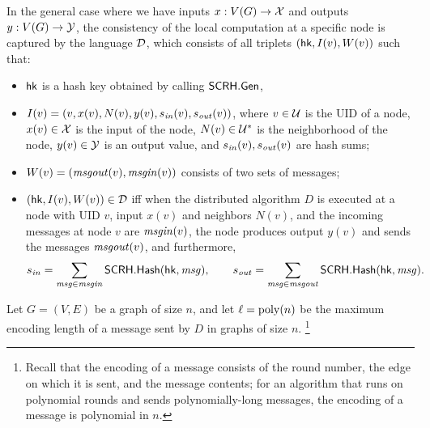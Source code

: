 In the general case where we have inputs $x : V(G) \rightarrow \mathcal{X}$
and outputs $y : V(G) \rightarrow \mathcal{Y}$,
the consistency of the local computation at a specific node is captured
by the
language $\mathcal{D}$,
which consists of all triplets $(\mathsf{hk}, I(v), W(v))$ such that:
\begin{itemize}
	\item $\mathsf{hk}$ is a hash key obtained by calling $\mathsf{SCRH}.\mathsf{Gen}$,
	\item $I(v) = (v, x(v), N(v), y(v), s_{\mathit{ in }}(v), s_{\mathit{ out }}(v))$,
		where
		$v \in \mathcal{U}$ is the UID of a node,
		$x(v) \in \mathcal{X}$ is the input of the node,
		$N(v) \in \mathcal{U}^{\ast}$ is the neighborhood of the node,
		$y(v) \in \mathcal{Y}$ is an output value, and $s_{\mathit{ in }}(v), s_{\mathit{ out }}(v)$ are hash sums;
	\item $W(v) = (\mathit{ msgout }(v), \mathit{ msgin }(v))$ consists of two sets of messages;
	\item $(\mathsf{hk}, I(v), W(v)) \in \mathcal{D}$ iff when the distributed algorithm $D$ is executed 
at a node with UID $v$, input $x(v)$ and neighbors $N(v)$,
and the incoming messages at node $v$ are $\mathit{ msgin }(v)$,
the node produces output $y(v)$ and sends the messages $\mathit{ msgout }(v)$,
and furthermore,
\begin{equation}
	s_{\mathit{ in }} = \sum_{\mathit{ msg } \in \mathit{ msgin }} \mathsf{SCRH}.\mathsf{Hash}(\mathsf{hk}, \mathit{ msg }),
	\qquad
	s_{\mathit{ out }} = \sum_{\mathit{ msg } \in \mathit{ msgout }} \mathsf{SCRH}.\mathsf{Hash}(\mathsf{hk}, \mathit{ msg }).
	\label{cond:msg_hash}
\end{equation}
\end{itemize}


Let $G = (V, E)$ be a graph of size $n$, and let $\ell = \operatorname{poly}(n)$ be the maximum encoding length of
a message sent by $D$ in graphs of size $n$.%
\footnote{Recall that the encoding of a message consists
of the round number, the edge on which it is sent, and the message contents;
for an algorithm that runs on polynomial rounds and sends polynomially-long messages,
the encoding of a message is polynomial in $n$.}


